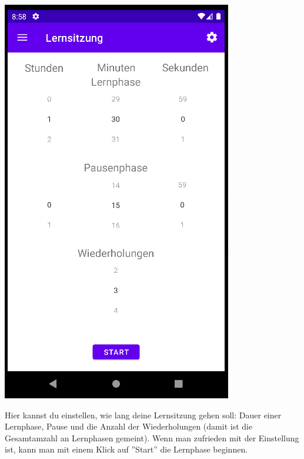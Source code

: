 \documentclass{article}
\begin{document}
\begin{center}
    \includegraphics[scale=0.6]{learn_start.png}
\end{center}
Hier kannst du einstellen, wie lang deine Lernsitzung gehen soll: Dauer einer Lernphase, Pause und die Anzahl der Wiederholungen (damit ist die Gesamtamzahl an Lernphasen gemeint). Wenn man zufrieden mit der Einstellung ist, kann man mit einem Klick auf ''Start'' die Lernphase beginnen.
\end{document}
